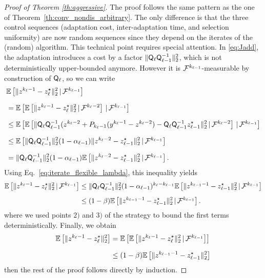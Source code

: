{\begin{proof}[Proof of Theorem \ref{th:aggressive}]
The proof follows the same pattern as the one of Theorem~\ref{th:conv_nondis_arbitrary}.
The only difference is that the three control sequences (adaptation cost, inter-adaptation time, and selection uniformity) are now random sequences
since they depend on the iterates of the (random) algorithm. This technical point requires special attention. 
In \eqref{eq:Jadd}, the adaptation introduces a cost by a factor $\|  {\mathsf{Q}}_\ell   {\mathsf{Q}}_{\ell-1}^{-1} \|_2^2 $, which is not deterministically upper-bounded  anymore. However it is $\mathcal{F}^{k_{\ell-1}}$-measurable by construction of ${\mathsf{Q}}_\ell$, so we can write
\begin{align*}
  \nonumber & \mathbb{E}\left[\|z^{k_\ell-1}-z^{\star}_{\ell}\|_2^2\,|\,\mathcal{F}^{k_{\ell-1}}\right] \\[1.5ex]
  \nonumber & = \mathbb{E}\left[\mathbb{E}\left[\|z^{k_\ell-1}-z^{\star}_{\ell}\|_2^2\,|\,\mathcal{F}^{k_{\ell}-2}\right]\,|\,\mathcal{F}^{k_{\ell-1}}\right]\\[1.5ex]
  &\leq   \mathbb{E}\left[\mathbb{E}\left[ \|  {\mathsf{Q}}_\ell   {\mathsf{Q}}_{\ell-1}^{-1}(z^{k_{\ell}-2} + P_{k_{\ell}-1}(y^{k_{\ell}-1}-z^{k_{\ell}-2}) - {\mathsf{Q}}_\ell   {\mathsf{Q}}_{\ell-1}^{-1}z^{\star}_{\ell-1}\|_2^2\,|\,\mathcal{F}^{k_{\ell}-2}\right]\,|\,\mathcal{F}^{k_{\ell-1}}\right]\\[1.5ex]
   \nonumber     &\leq \mathbb{E}\left[\|  {\mathsf{Q}}_\ell   {\mathsf{Q}}_{\ell-1}^{-1} \|_2^2  (1-\alpha_{\ell-1}) \|z^{k_\ell-2}-z^{\star}_{\ell-1}\|_2^2\,|\,\mathcal{F}^{k_{\ell-1}}\right]\\[1.5ex]
      \nonumber     &= \| {\mathsf{Q}}_\ell   {\mathsf{Q}}_{\ell-1}^{-1} \|_2^2  (1-\alpha_{\ell-1}) \mathbb{E}\left[ \|z^{k_\ell-2}-z^{\star}_{\ell-1}\|_2^2\,|\,\mathcal{F}^{k_{\ell-1}}\right].
   \end{align*} 
   Using Eq.~\eqref{eq:iterate_flexible_lambda}, this inequality yields  
  \begin{align*}
   \mathbb{E}\left[\|z^{k_\ell-1}-z^{\star}_{\ell}\|_2^2\,|\,\mathcal{F}^{k_{\ell-1}}\right]
   &\leq \|  {\mathsf{Q}}_\ell   {\mathsf{Q}}_{\ell-1}^{-1} \|_2^2  (1-\alpha_{\ell-1})^{k_\ell-k_{\ell-1}}  \mathbb{E}\left[  \|z^{k_{\ell-1}-1}-z^{\star}_{\ell-1}\|_2^2\,|\,\mathcal{F}^{k_{\ell-1}}\right]\\[1ex]
&\leq (1-\beta) \mathbb{E}\left[  \|z^{k_{\ell-1}-1}-z^{\star}_{\ell-1}\|_2^2\,|\,\mathcal{F}^{k_{\ell-1}}\right].
\end{align*}
where we used points $2)$ and $3)$ of the strategy to bound the first terms deterministically. Finally, we obtain
\begin{align*}
\mathbb{E}\left[\|z^{k_\ell-1}-z^{\star}_{\ell}\|_2^2\right]
& = \mathbb{E}\left[\mathbb{E}\left[\|z^{k_\ell-1}-z^{\star}_{\ell}\|_2^2\,|\,\mathcal{F}^{k_{\ell-1}}\right]\right]\\[1.5ex]
&\leq (1-\beta) \mathbb{E}\left[\|z^{k_{\ell-1}-1}-z^{\star}_{\ell-1}\|_2^2\right]
\end{align*}
then the rest of the proof follows directly by induction.
\end{proof}
        
}
